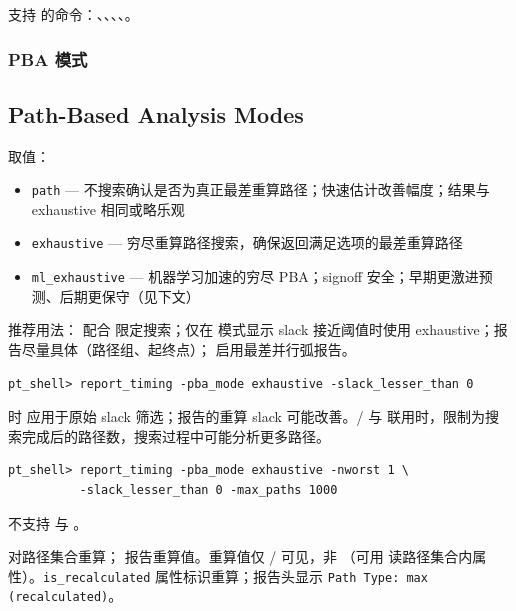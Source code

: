 支持  的命令：、、、、。

\subsubsection{PBA 模式}
\subsection*{Path-Based Analysis Modes}

 取值：
\begin{itemize}
  \item \texttt{path} — 不搜索确认是否为真正最差重算路径；快速估计改善幅度；结果与 exhaustive 相同或略乐观
  \item \texttt{exhaustive} — 穷尽重算路径搜索，确保返回满足选项的最差重算路径
  \item \texttt{ml\_exhaustive} — 机器学习加速的穷尽 PBA；signoff 安全；早期更激进预测、后期更保守（见下文）
\end{itemize}

推荐用法： 配合  限定搜索；仅在  模式显示 slack 接近阈值时使用 exhaustive；报告尽量具体（路径组、起终点）； 启用最差并行弧报告。

\begin{lstlisting}
pt_shell> report_timing -pba_mode exhaustive -slack_lesser_than 0
\end{lstlisting}

 时  应用于原始 slack 筛选；报告的重算 slack 可能改善。/ 与  联用时，限制为搜索完成后的路径数，搜索过程中可能分析更多路径。

\begin{lstlisting}
pt_shell> report_timing -pba_mode exhaustive -nworst 1 \
          -slack_lesser_than 0 -max_paths 1000
\end{lstlisting}

 不支持  与 。

 对路径集合重算； 报告重算值。重算值仅 / 可见，非 （可用  读路径集合内属性）。\texttt{is\_recalculated} 属性标识重算；报告头显示 \texttt{Path Type: max (recalculated)}。


